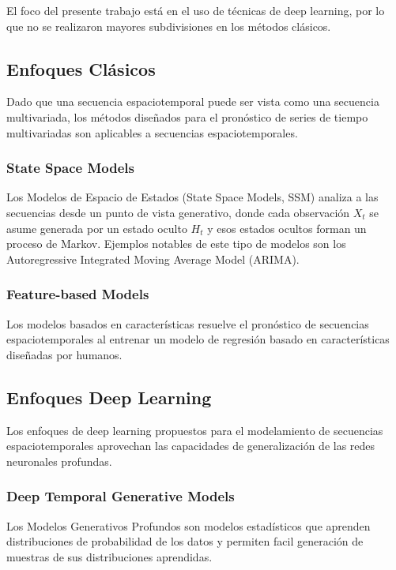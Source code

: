 El foco del presente trabajo está en el uso de técnicas de deep learning, por 
lo que no se realizaron mayores subdivisiones en los métodos clásicos.

\subsection{Enfoques Clásicos}
Dado que una secuencia espaciotemporal puede ser vista como una secuencia 
multivariada, los métodos diseñados para el pronóstico de series de tiempo 
multivariadas son aplicables a secuencias espaciotemporales.

\subsubsection{State Space Models}
Los Modelos de Espacio de Estados (State Space Models, SSM) analiza a las 
secuencias desde un punto de vista generativo, donde cada observación $X_t$ se 
asume generada por un estado oculto $H_t$ y esos estados ocultos forman un 
proceso de Markov. Ejemplos notables de este tipo de modelos son los 
Autoregressive Integrated Moving Average Model (ARIMA).

\subsubsection{Feature-based Models}
Los modelos basados en características resuelve el pronóstico de secuencias 
espaciotemporales al entrenar un modelo de regresión basado en características 
diseñadas por humanos.

\subsection{Enfoques Deep Learning}
Los enfoques de deep learning propuestos para el modelamiento de secuencias 
espaciotemporales aprovechan las capacidades de generalización de las redes
neuronales profundas.

\subsubsection{Deep Temporal Generative Models}
Los Modelos Generativos Profundos son modelos estadísticos que aprenden 
distribuciones de probabilidad de los datos y permiten facil generación de 
muestras de sus distribuciones aprendidas.

